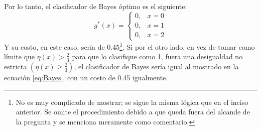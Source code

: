 Por lo tanto, el clasificador de Bayes óptimo es el siguiente: 
\begin{equation}
    g^*(x) = 
    \begin{cases}
        0, & x=0 \\
        0, & x=1 \\
        0, & x=2
    \end{cases}
\end{equation}
Y su costo, en este caso, sería de 0.45\footnote{No es muy complicado de mostrar; se sigue la misma lógica que en el inciso anterior. Se omite el procedimiento debido a que queda fuera del alcande de la pregunta y se menciona meramente como comentario.}. Si por el otro lado, en vez de tomar como límite 
que $\eta(x) > \frac{2}{3}$ para que lo clasifique como 1, fuera una desigualdad 
no estricta $(\eta(x) \ge \frac{2}{3})$, el clasificador de Bayes sería igual al mostrado en la ecuación \ref{eq:Bayes}, 
con un costo de 0.45 igualmente.


